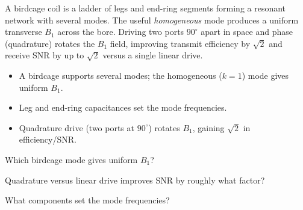 \begin{workedexample}
A birdcage coil is a ladder of legs and end-ring segments forming a
resonant network with several modes. The useful \emph{homogeneous} mode produces
a uniform transverse $B_1$ across the bore. Driving two ports $90^{\circ}$ apart in
space and phase (quadrature) rotates the $B_1$ field, improving transmit
efficiency by $\sqrt{2}$ and receive SNR by up to $\sqrt{2}$ versus a single
linear drive.
\end{workedexample}

\begin{keytakeaways}
\begin{itemize}[leftmargin=1.4em,itemsep=2pt]
\item A birdcage supports several modes; the homogeneous ($k = 1$) mode gives uniform $B_1$.
\item Leg and end-ring capacitances set the mode frequencies.
\item Quadrature drive (two ports at $90^{\circ}$) rotates $B_1$, gaining $\sqrt{2}$ in efficiency/SNR.
\end{itemize}
\end{keytakeaways}

\begin{exercises}
\item Which birdcage mode gives uniform $B_1$?
\item Quadrature versus linear drive improves SNR by roughly what factor?
\item What components set the mode frequencies?
\end{exercises}

